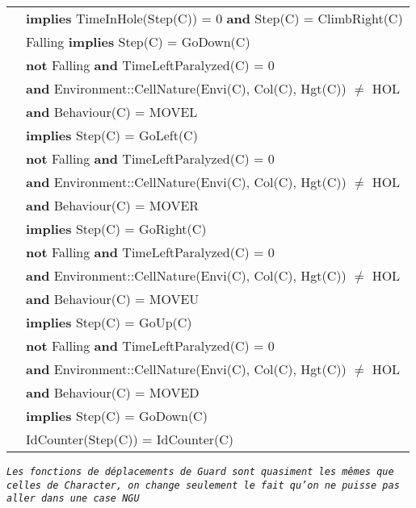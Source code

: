 \documentclass[7pt]{article}
\begin{document}
\begin{tabular}{rl}
& \quad \textbf{implies} TimeInHole(Step(C)) = 0 \textbf{and} Step(C) = ClimbRight(C) \\
& Falling \textbf{implies} Step(C) = GoDown(C) \\
& \textbf{not} Falling \textbf{and} TimeLeftParalyzed(C) = 0 \\
& \quad \textbf{and} Environment::CellNature(Envi(C), Col(C), Hgt(C)) $\neq$ HOL \\
& \quad \textbf{and} Behaviour(C) = MOVEL \\
& \quad \textbf{implies} Step(C) = GoLeft(C) \\
& \textbf{not} Falling \textbf{and} TimeLeftParalyzed(C) = 0 \\
& \quad \textbf{and} Environment::CellNature(Envi(C), Col(C), Hgt(C)) $\neq$ HOL \\
& \quad \textbf{and} Behaviour(C) = MOVER \\
& \quad \textbf{implies} Step(C) = GoRight(C) \\
& \textbf{not} Falling \textbf{and} TimeLeftParalyzed(C) = 0 \\
& \quad \textbf{and} Environment::CellNature(Envi(C), Col(C), Hgt(C)) $\neq$ HOL \\
& \quad \textbf{and} Behaviour(C) = MOVEU \\
& \quad \textbf{implies} Step(C) = GoUp(C) \\
& \textbf{not} Falling \textbf{and} TimeLeftParalyzed(C) = 0 \\
& \quad \textbf{and} Environment::CellNature(Envi(C), Col(C), Hgt(C)) $\neq$ HOL \\
& \quad \textbf{and} Behaviour(C) = MOVED \\
& \quad \textbf{implies} Step(C) = GoDown(C) \\
& IdCounter(Step(C)) = IdCounter(C) \\


\end{tabular}
\newpage
\texttt{\textit{Les fonctions de déplacements de Guard sont quasiment les mêmes que celles de Character, on change seulement le fait qu'on ne puisse pas aller dans une case NGU}} \\ \\
\end{document}

